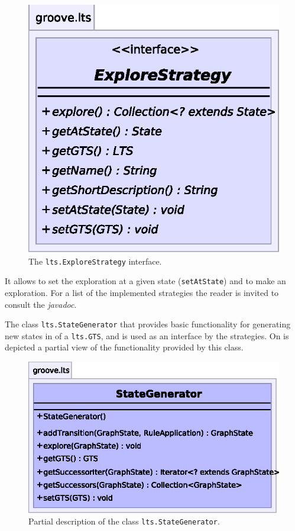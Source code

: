 \begin{figure}[ht]
  \centering
  \includegraphics[scale=0.8]{fig/ExploreStrategy}
  \caption{The {\tt lts.ExploreStrategy} interface.}
\end{figure}

It allows to set the exploration at a given state ({\tt setAtState}) and to
make an exploration. For a list of the implemented strategies the reader is
invited to consult the {\em javadoc}.

The class {\tt lts.StateGenerator} that provides basic functionality for
generating new states in of a {\tt lts.GTS}, and is used as an interface by
the strategies. On  is depicted a partial view of the
functionality provided by this class.

\begin{figure}[ht]
  \centering
  \includegraphics{fig/StateGenerator}
  \caption{Partial description of the class {\tt lts.StateGenerator}.}
\end{figure}

